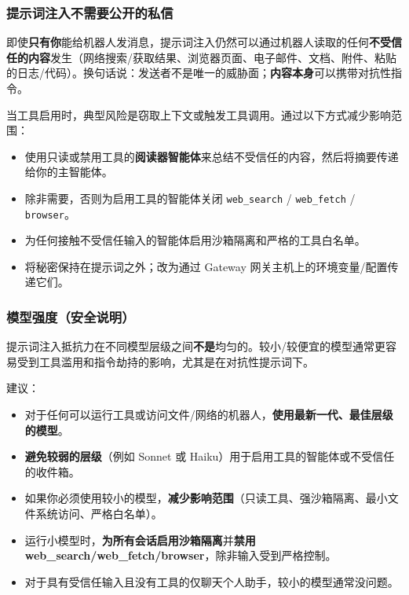 \subsubsection{提示词注入不需要公开的私信}


即使\textbf{只有你}能给机器人发消息，提示词注入仍然可以通过机器人读取的任何\textbf{不受信任的内容}发生（网络搜索/获取结果、浏览器页面、电子邮件、文档、附件、粘贴的日志/代码）。换句话说：发送者不是唯一的威胁面；\textbf{内容本身}可以携带对抗性指令。

当工具启用时，典型风险是窃取上下文或触发工具调用。通过以下方式减少影响范围：

\begin{itemize}
  \item 使用只读或禁用工具的\textbf{阅读器智能体}来总结不受信任的内容，然后将摘要传递给你的主智能体。
  \item 除非需要，否则为启用工具的智能体关闭 \texttt{web\_search} / \texttt{web\_fetch} / \texttt{browser}。
  \item 为任何接触不受信任输入的智能体启用沙箱隔离和严格的工具白名单。
  \item 将秘密保持在提示词之外；改为通过 Gateway 网关主机上的环境变量/配置传递它们。
\end{itemize}


\subsubsection{模型强度（安全说明）}


提示词注入抵抗力在不同模型层级之间\textbf{不是}均匀的。较小/较便宜的模型通常更容易受到工具滥用和指令劫持的影响，尤其是在对抗性提示词下。

建议：

\begin{itemize}
  \item 对于任何可以运行工具或访问文件/网络的机器人，\textbf{使用最新一代、最佳层级的模型}。
  \item \textbf{避免较弱的层级}（例如 Sonnet 或 Haiku）用于启用工具的智能体或不受信任的收件箱。
  \item 如果你必须使用较小的模型，\textbf{减少影响范围}（只读工具、强沙箱隔离、最小文件系统访问、严格白名单）。
  \item 运行小模型时，\textbf{为所有会话启用沙箱隔离}并\textbf{禁用 web\_search/web\_fetch/browser}，除非输入受到严格控制。
  \item 对于具有受信任输入且没有工具的仅聊天个人助手，较小的模型通常没问题。
\end{itemize}


